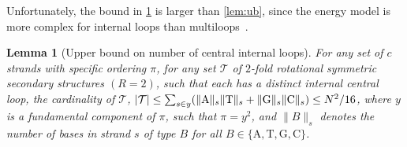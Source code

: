 \documentclass[11pt,letterpaper]{article}  \usepackage[margin=1in]{geometry}
\newtheorem{lemma}[theorem]{Lemma}
\theoremstyle{definition}  \newtheorem{Definition}[theorem]{Definition}
\begin{document}
Unfortunately, the bound in \cref{lem:ub2} is larger than \cref{lem:ub}, since the energy model is more complex for internal loops than multiloops~\cite{dirks2003partition}. 

\begin{lemma}[Upper bound on number of  central internal loops]\label{lem:ub2}
	For any set of $c$ strands with specific ordering $\pi$, for any set $\mathcal{T}$ of $2$-fold rotational symmetric secondary structures $(R=2)$, 
	such that each has a distinct internal central loop, the  cardinality of $\mathcal{T}$, $ |\mathcal{T}| \leq \sum_{s\in y} (\lVert \mathrm{A} \rVert_s \lVert \mathrm{T} \rVert_s+ \lVert \mathrm{G} \rVert_s \lVert \mathrm{C} \rVert_s ) \leq N^2/16$, 
	where $y$ is a fundamental component of $\pi$, such that $\pi = y^2$, and $\parallel\! \! B \!\! \parallel_s$  
	denotes the number of bases in strand $s$ of type $B$ for all $B\in\{\mathrm{A},\mathrm{T},\mathrm{G},\mathrm{C}\}$.
\end{lemma} 
\end{document}
